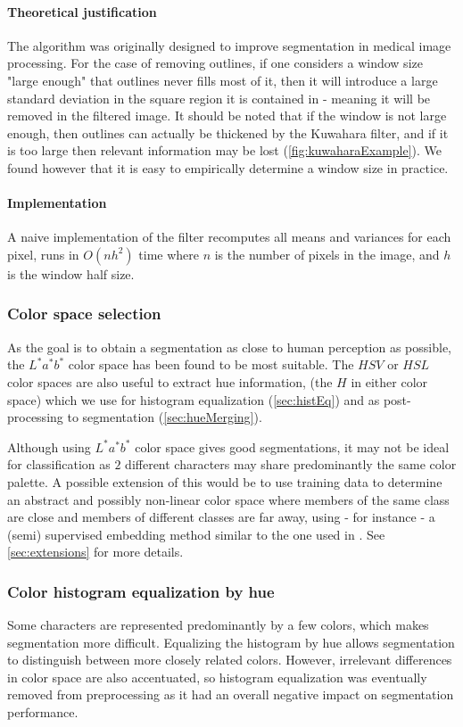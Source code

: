 \paragraph{Theoretical justification} The algorithm was originally designed to improve segmentation in medical image processing. For the case of removing outlines, if one considers a window size "large enough" that outlines never fills most of it, then it will introduce a large standard deviation in the square region it is contained in - meaning it will be removed in the filtered image. It should be noted that if the window is not large enough, then outlines can actually be thickened by the Kuwahara filter, and if it is too large then relevant information may be lost (\autoref{fig:kuwaharaExample}). We found however that it is easy to empirically determine a window size in practice.

\paragraph{Implementation} A naive implementation of the filter recomputes all means and variances for each pixel, runs in $O(nh^2)$ time where $n$ is the number of pixels in the image, and $h$ is the window half size.

\subsubsection{Color space selection}

As the goal is to obtain a segmentation as close to human perception as possible, the $L^*a^*b^*$ color space has been found to be most suitable. The $HSV$ or $HSL$ color spaces are also useful to extract hue information, (the $H$ in either color space) which we use for histogram equalization (\autoref{sec:histEq}) and as post-processing to segmentation (\autoref{sec:hueMerging}).

Although using $L^*a^*b^*$ color space gives good segmentations, it may not be ideal for classification as $2$ different characters may share predominantly the same color palette. A possible extension of this would be to use training data to determine an abstract and possibly non-linear color space where members of the same class are close and members of different classes are far away, using - for instance - a (semi) supervised embedding method similar to the one used in \cite{urahama2007semi}. See \autoref{sec:extensions} for more details.

\subsubsection{Color histogram equalization by hue}
\label{sec:histEq}

Some characters are represented predominantly by a few colors, which makes segmentation more difficult. Equalizing the histogram by hue allows segmentation to distinguish between more closely related colors. However, irrelevant differences in color space are also accentuated, so histogram equalization was eventually removed from preprocessing as it had an overall negative impact on segmentation performance.

